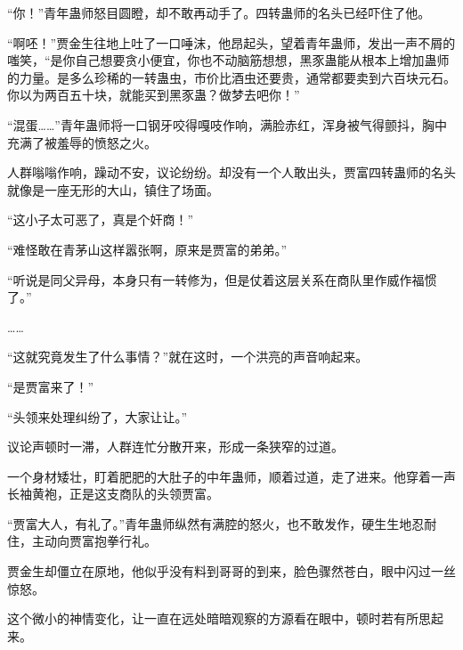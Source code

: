 \begin{this_body}
“你！”青年蛊师怒目圆瞪，却不敢再动手了。四转蛊师的名头已经吓住了他。

“啊呸！”贾金生往地上吐了一口唾沫，他昂起头，望着青年蛊师，发出一声不屑的嗤笑，“是你自己想要贪小便宜，你也不动脑筋想想，黑豕蛊能从根本上增加蛊师的力量。是多么珍稀的一转蛊虫，市价比酒虫还要贵，通常都要卖到六百块元石。你以为两百五十块，就能买到黑豕蛊？做梦去吧你！”

“混蛋……”青年蛊师将一口钢牙咬得嘎吱作响，满脸赤红，浑身被气得颤抖，胸中充满了被羞辱的愤怒之火。

人群嗡嗡作响，躁动不安，议论纷纷。却没有一个人敢出头，贾富四转蛊师的名头就像是一座无形的大山，镇住了场面。

“这小子太可恶了，真是个奸商！”

“难怪敢在青茅山这样嚣张啊，原来是贾富的弟弟。”

“听说是同父异母，本身只有一转修为，但是仗着这层关系在商队里作威作福惯了。”

……

“这就究竟发生了什么事情？”就在这时，一个洪亮的声音响起来。

“是贾富来了！”

“头领来处理纠纷了，大家让让。”

议论声顿时一滞，人群连忙分散开来，形成一条狭窄的过道。

一个身材矮壮，盯着肥肥的大肚子的中年蛊师，顺着过道，走了进来。他穿着一声长袖黄袍，正是这支商队的头领贾富。

“贾富大人，有礼了。”青年蛊师纵然有满腔的怒火，也不敢发作，硬生生地忍耐住，主动向贾富抱拳行礼。

贾金生却僵立在原地，他似乎没有料到哥哥的到来，脸色骤然苍白，眼中闪过一丝惊怒。

这个微小的神情变化，让一直在远处暗暗观察的方源看在眼中，顿时若有所思起来。

\end{this_body}

